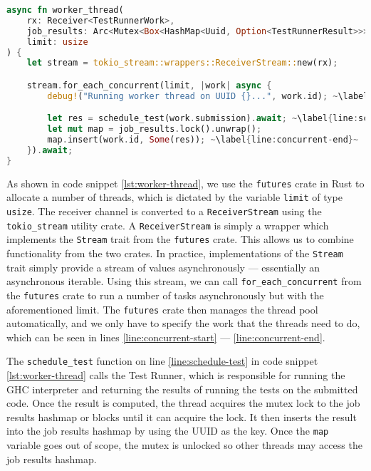 \begin{lstlisting}[language=rust, escapechar=~, caption={Rust code showing allocation of thread pools and scheduling of code submission processing}, label={lst:worker-thread}]
async fn worker_thread(
    rx: Receiver<TestRunnerWork>,
    job_results: Arc<Mutex<Box<HashMap<Uuid, Option<TestRunnerResult>>>>>,
    limit: usize
) {
    let stream = tokio_stream::wrappers::ReceiverStream::new(rx);

    stream.for_each_concurrent(limit, |work| async {
        debug!("Running worker thread on UUID {}...", work.id); ~\label{line:concurrent-start}~

        let res = schedule_test(work.submission).await; ~\label{line:schedule-test}~
        let mut map = job_results.lock().unwrap();
        map.insert(work.id, Some(res)); ~\label{line:concurrent-end}~
    }).await;
}
\end{lstlisting}

As shown in code snippet \ref{lst:worker-thread}, we use the \texttt{futures} crate in Rust to allocate a number of threads, which is dictated by the variable \texttt{limit} of type \texttt{usize}.
The receiver channel is converted to a \texttt{ReceiverStream} using the \texttt{tokio\_stream} utility crate.
A \texttt{ReceiverStream} is simply a wrapper which implements the \texttt{Stream} trait from the \texttt{futures} crate.
This allows us to combine functionality from the two crates.
In practice, implementations of the \texttt{Stream} trait simply provide a stream of values asynchronously --- essentially an asynchronous iterable.
Using this stream, we can call \texttt{for\_each\_concurrent} from the \texttt{futures} crate to run a number of tasks asynchronously but with the aforementioned limit.
The \texttt{futures} crate then manages the thread pool automatically, and we only have to specify the work that the threads need to do, which can be seen in lines \ref{line:concurrent-start} --- \ref{line:concurrent-end}.

The \texttt{schedule\_test} function on line \ref{line:schedule-test} in code snippet \ref{lst:worker-thread} calls the Test Runner, which is responsible for running the GHC interpreter and returning the results of running the tests on the submitted code.
Once the result is computed, the thread acquires the mutex lock to the job results hashmap or blocks until it can acquire the lock.
It then inserts the result into the job results hashmap by using the UUID as the key.
Once the \texttt{map} variable goes out of scope, the mutex is unlocked so other threads may access the job results hashmap.

